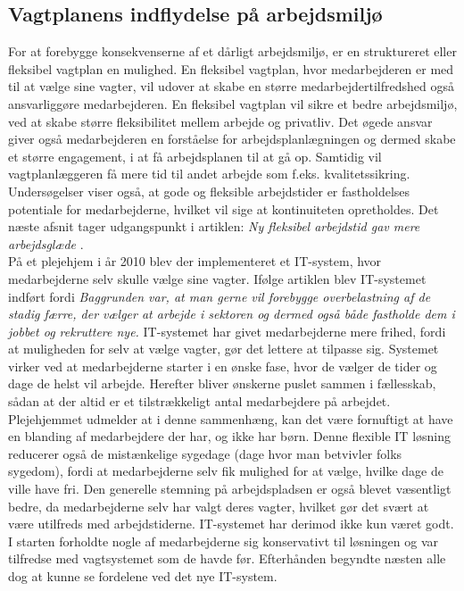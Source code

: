 \subsection{Vagtplanens indflydelse på arbejdsmiljø}
For at forebygge konsekvenserne af et dårligt arbejdsmiljø, er en struktureret eller fleksibel vagtplan en mulighed. En fleksibel vagtplan, hvor medarbejderen er med til at vælge sine vagter, vil udover at skabe en større medarbejdertilfredshed også ansvarliggøre medarbejderen. En fleksibel vagtplan vil sikre et bedre arbejdsmiljø, ved at skabe større fleksibilitet mellem arbejde og privatliv. Det øgede ansvar giver også medarbejderen en forståelse for arbejdsplanlægningen og dermed skabe et større engagement, i at få arbejdsplanen til at gå op. Samtidig vil vagtplanlæggeren få mere tid til andet arbejde som f.eks. kvalitetssikring.
Undersøgelser viser også, at gode og fleksible arbejdstider er fastholdelses potentiale for medarbejderne, hvilket vil sige at kontinuiteten opretholdes. 
Det næste afsnit tager udgangspunkt i artiklen: \textit{Ny fleksibel arbejdstid gav mere arbejdsglæde}
\citep{Thomse2014}.
\\
På et plejehjem i år 2010 blev der implementeret et IT-system, hvor medarbejderne selv skulle vælge sine vagter. Ifølge artiklen blev IT-systemet indført fordi \textit{Baggrunden var, at man gerne vil forebygge overbelastning af de stadig færre, der vælger at arbejde i sektoren og dermed også både fastholde dem i jobbet og rekruttere nye.} IT-systemet har givet medarbejderne mere frihed, fordi at muligheden for selv at vælge vagter, gør det lettere at tilpasse sig. Systemet virker ved at medarbejderne starter i en ønske fase, hvor de vælger de tider og dage de helst vil arbejde. Herefter bliver ønskerne puslet sammen i fællesskab, sådan at der altid er et tilstrækkeligt antal medarbejdere på arbejdet. Plejehjemmet udmelder at i denne sammenhæng, kan det være fornuftigt at have en blanding af medarbejdere der har, og ikke har børn. Denne flexible IT løsning reducerer også de mistænkelige sygedage (dage hvor man betvivler folks sygedom), fordi at medarbejderne selv fik mulighed for at vælge, hvilke dage de ville have fri. Den generelle stemning på arbejdspladsen er også blevet væsentligt bedre, da medarbejderne selv har valgt deres vagter, hvilket gør det svært at være utilfreds med arbejdstiderne. 
IT-systemet har derimod ikke kun været godt. I starten forholdte nogle af medarbejderne sig konservativt til løsningen og var tilfredse med vagtsystemet som de havde før. Efterhånden begyndte næsten alle dog at kunne se fordelene ved det nye IT-system. 

